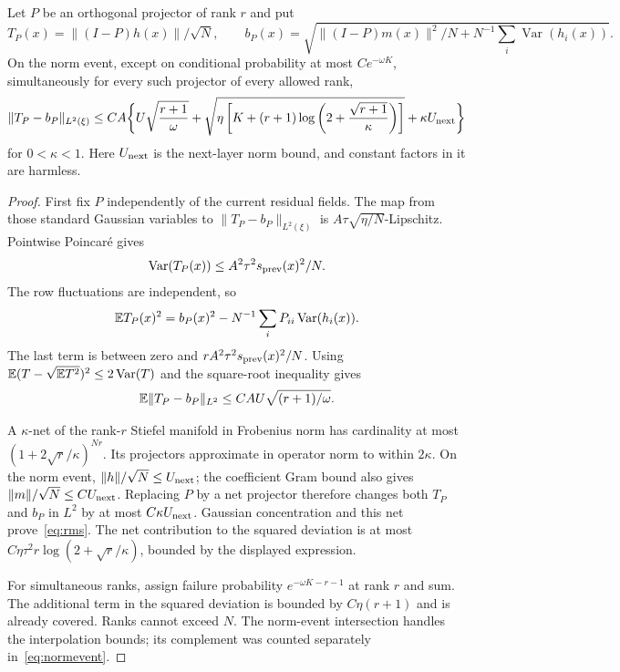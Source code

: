 \begin{lemma}
\label{lem:rms}
Let $P$ be an orthogonal projector of rank $r$ and put
\[
 T_P(x)=\|(I-P)h(x)\|/\sqrt N,\qquad
 b_P(x)=\sqrt{\|(I-P)m(x)\|^2/N+
                      N^{-1}\sum_i\operatorname{Var}(h_i(x))}.
\]
On the norm event, except on conditional probability at most $Ce^{-\omega K}$, simultaneously for every such projector of every allowed rank,
\begin{align}
 \|T_P-b_P\|_{L^2(\xi)}
 \le C A\biggl\{
 U\sqrt{\frac{r+1}{\omega}}
 +\sqrt{\eta\left[K+(r+1)
                  \log\left(2+\frac{\sqrt{r+1}}{\kappa}\right)\right]}
 +\kappa U_{\rm next}
 \biggr\}
 \label{eq:rms}
\end{align}
for $0<\kappa<1$. Here $U_{\rm next}$ is the next-layer norm bound, and constant factors in it are harmless.
\end{lemma}
\begin{proof}
First fix $P$ independently of the current residual fields. The map from those standard Gaussian variables to $\|T_P-b_P\|_{L^2(\xi)}$ is $A\tau\sqrt{\eta/N}$-Lipschitz. Pointwise Poincar\'e gives
\[
 \operatorname{Var}(T_P(x))
       \le A^2\tau^2s_{\rm prev}(x)^2/N.
\]
The row fluctuations are independent, so
\[
 \mathbb E T_P(x)^2=b_P(x)^2-
                 N^{-1}\sum_iP_{ii}\operatorname{Var}(h_i(x)).
\]
The last term is between zero and $rA^2\tau^2s_{\rm prev}(x)^2/N$.
Using $\mathbb E(T-\sqrt{\mathbb E T^2})^2\le2\operatorname{Var}(T)$ and the square-root inequality gives
\[
 \mathbb E\|T_P-b_P\|_{L^2}\le C A U\sqrt{(r+1)/\omega}.
\]

A $\kappa$-net of the rank-$r$ Stiefel manifold in Frobenius norm has cardinality at most $(1+2\sqrt r/\kappa)^{Nr}$. Its projectors approximate in operator norm to within $2\kappa$. On the norm event, $\|h\|/\sqrt N\le U_{\rm next}$; the coefficient Gram bound also gives $\|m\|/\sqrt N\le C U_{\rm next}$. Replacing $P$ by a net projector therefore changes both $T_P$ and $b_P$ in $L^2$ by at most $C\kappa U_{\rm next}$. Gaussian concentration and this net prove~\eqref{eq:rms}. The net contribution to the squared deviation is at most $C\eta\tau^2r\log(2+\sqrt r/\kappa)$, bounded by the displayed expression.

For simultaneous ranks, assign failure probability $e^{-\omega K-r-1}$ at rank $r$ and sum. The additional term in the squared deviation is bounded by $C\eta(r+1)$ and is already covered. Ranks cannot exceed $N$. The norm-event intersection handles the interpolation bounds; its complement was counted separately in~\eqref{eq:normevent}.
\end{proof}

